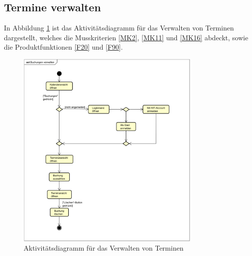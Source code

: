 \subsection{Termine verwalten}
In Abbildung \ref{fig:activity_diagram_booking_manage} ist das Aktivitätsdiagramm für das Verwalten von Terminen dargestellt,
welches die Musskriterien \ref{MK2}, \ref{MK11} und \ref{MK16} abdeckt, sowie die Produktfunktionen \ref{F20} und \ref{F90}.
\begin{figure}[ht]
    \centering
    \includegraphics[width=0.8\textwidth]{figures/activitydiagrams/buchungverwalten}
    \caption{Aktivitätsdiagramm für das Verwalten von Terminen}
    \label{fig:activity_diagram_booking_manage}
\end{figure}

\clearpage
